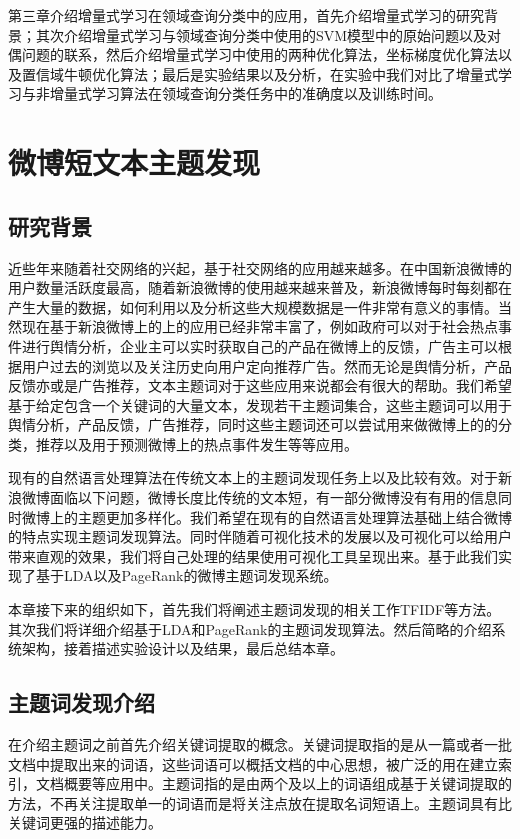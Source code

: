 \documentclass[master]{njuthesis}
\begin{document}
    第三章介绍增量式学习在领域查询分类中的应用，首先介绍增量式学习的研究背景；其次介绍增量式学习与领域查询分类中使用的SVM模型中的原始问题以及对偶问题的联系，然后介绍增量式学习中使用的两种优化算法，坐标梯度优化算法以及置信域牛顿优化算法；最后是实验结果以及分析，在实验中我们对比了增量式学习与非增量式学习算法在领域查询分类任务中的准确度以及训练时间。

\chapter{微博短文本主题发现}\label{chapter_keyword}
\section{研究背景}

    近些年来随着社交网络的兴起，基于社交网络的应用越来越多。在中国新浪微博的用户数量活跃度最高，随着新浪微博的使用越来越来普及，新浪微博每时每刻都在产生大量的数据，如何利用以及分析这些大规模数据是一件非常有意义的事情。当然现在基于新浪微博上的上的应用已经非常丰富了，例如政府可以对于社会热点事件进行舆情分析，企业主可以实时获取自己的产品在微博上的反馈，广告主可以根据用户过去的浏览以及关注历史向用户定向推荐广告。然而无论是舆情分析，产品反馈亦或是广告推荐，文本主题词对于这些应用来说都会有很大的帮助。我们希望基于给定包含一个关键词的大量文本，发现若干主题词集合，这些主题词可以用于舆情分析，产品反馈，广告推荐，同时这些主题词还可以尝试用来做微博上的的分类，推荐以及用于预测微博上的热点事件发生等等应用。

    现有的自然语言处理算法在传统文本上的主题词发现任务上以及比较有效。对于新浪微博面临以下问题，微博长度比传统的文本短，有一部分微博没有有用的信息同时微博上的主题更加多样化。我们希望在现有的自然语言处理算法基础上结合微博的特点实现主题词发现算法。同时伴随着可视化技术的发展以及可视化可以给用户带来直观的效果，我们将自己处理的结果使用可视化工具呈现出来。基于此我们实现了基于LDA以及PageRank的微博主题词发现系统。

    本章接下来的组织如下，首先我们将阐述主题词发现的相关工作TFIDF等方法。其次我们将详细介绍基于LDA和PageRank的主题词发现算法。然后简略的介绍系统架构，接着描述实验设计以及结果，最后总结本章。

\section{主题词发现介绍}

 在介绍主题词之前首先介绍关键词提取的概念。关键词提取指的是从一篇或者一批文档中提取出来的词语，这些词语可以概括文档的中心思想，被广泛的用在建立索引，文档概要等应用中。主题词指的是由两个及以上的词语组成基于关键词提取的方法，不再关注提取单一的词语而是将关注点放在提取名词短语上。主题词具有比关键词更强的描述能力。
\end{document}
